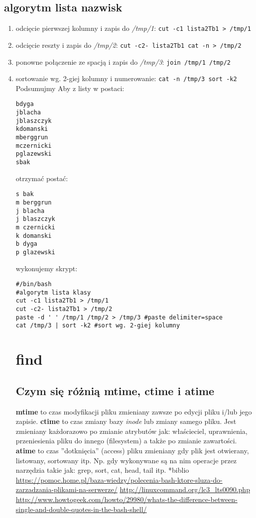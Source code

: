 \documentclass[a4paper,titlepage,12pt]{mwart}
\begin{document}
\subsection{algorytm lista nazwisk}
\begin{enumerate}
\item{odcięcie pierwszej kolumny i zapis do \textit{/tmp/1}: \texttt{cut -c1 lista2Tb1 > /tmp/1}}
\item{odcięcie reszty i zapis do \textit{/tmp/2}: \texttt{cut -c2- lista2Tb1 \textbar cat -n > /tmp/2}}
\item{ponowne połączenie ze spacją i zapis do \textit{/tmp/3}: \texttt{join /tmp/1 /tmp/2}}
\item{sortowanie wg. 2-giej kolumny i numerowanie: \texttt{cat -n /tmp/3 \textbar sort -k2}}
Podsumujmy\newline
Aby z listy w postaci:
\begin{verbatim}
bdyga
jblacha
jblaszczyk
kdomanski
mberggrun
mczernicki
pglazewski
sbak
\end{verbatim}
otrzymać postać:
\begin{verbatim}
s bak
m berggrun
j blacha
j blaszczyk
m czernicki
k domanski
b dyga
p glazewski
\end{verbatim}
wykonujemy skrypt:
\begin{verbatim}
#/bin/bash
#algorytm lista klasy
cut -c1 lista2Tb1 > /tmp/1
cut -c2- lista2Tb1 > /tmp/2
paste -d ' ' /tmp/1 /tmp/2 > /tmp/3 #paste delimiter=space
cat /tmp/3 | sort -k2 #sort wg. 2-giej kolumny
\end{verbatim}
\section{find}
\subsection{Czym się różnią \textbf{mtime}, \textbf{ctime} i \textbf{atime}}
\textbf{mtime} to czas modyfikacji pliku zmieniany zawsze po edycji pliku i/lub jego zapisie.\newline
\textbf{ctime} to czas zmiany bazy \textit{inode} lub zmiany samego pliku. Jest zmieniany każdorazowo po zmianie atrybutów jak: właścieciel, uprawnienia, przeniesienia pliku do innego (filesystem) a także po zmianie zawartości.\newline
\textbf{atime} to czas ''dotknięcia'' (access) pliku zmieniany gdy plik jest otwierany, listowany, sortowany itp. Np. gdy wykonywane są na nim operacje przez narzędzia takie jak: grep, sort, cat, head, tail itp.
*biblio
\url{https://pomoc.home.pl/baza-wiedzy/polecenia-bash-ktore-sluza-do-zarzadzania-plikami-na-serwerze/}
\url{http://linuxcommand.org/lc3\_lts0090.php}
\url{http://www.howtogeek.com/howto/29980/whats-the-difference-between-single-and-double-quotes-in-the-bash-shell/}

\end{enumerate}
\end{document}
